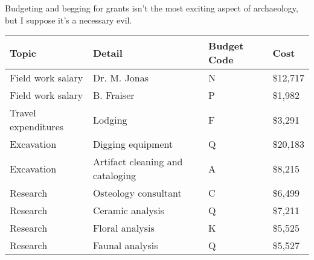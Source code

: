 Budgeting and begging for grants isn't the most exciting aspect of
archaeology, but I suppose it's a necessary evil.

\begin{center}
\begin{tabular}{llll}
\textbf{Topic}      & \textbf{Detail}                  & \textbf{Budget Code} & \textbf{Cost}     \\\hline
Field work salary   & Dr. M. Jonas                     & N           & \$12,717 \\
Field work salary   & B. Fraiser                       & P           & \$1,982  \\
Travel expenditures & Lodging                          & F           & \$3,291  \\
Excavation          & Digging equipment                & Q           & \$20,183 \\
Excavation          & Artifact cleaning and cataloging & A           & \$8,215  \\
Research            & Osteology consultant             & C           & \$6,499  \\
Research            & Ceramic analysis                 & Q           & \$7,211  \\
Research            & Floral analysis                  & K           & \$5,525  \\
Research            & Faunal analysis                  & Q           & \$5,527 
\end{tabular}
\end{center}
